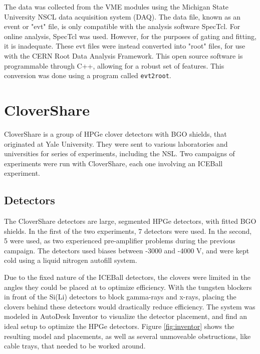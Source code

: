 The data was collected from the VME modules using the Michigan State University NSCL data acquisition system (DAQ)\citep{nscl:_daq}. The data file, known as an event or "evt" file, is only compatible with the analysis software SpecTcl\citep{nscl:_daq}. For online analysis, SpecTcl was used. However, for the purposes of gating and fitting, it is inadequate. These evt files were instead converted into "root" files, for use with the CERN Root Data Analysis Framework\citep{brun97:_root}. This open source software is programmable through C++, allowing for a robust set of features. This conversion was done using a program called \texttt{evt2root}\citep{smith14:_evt2root}.

\section{CloverShare}

CloverShare is a group of HPGe clover detectors with BGO shields, that originated at Yale University. They were sent to various laboratories and universities for series of experiments, including the NSL. Two campaigns of experiments were run with CloverShare, each one involving an ICEBall experiment.

\subsection{Detectors}

The CloverShare detectors are large, segmented HPGe detectors, with fitted BGO shields. In the first of the two experiments, 7 detectors were used. In the second, 5 were used, as two experienced pre-amplifier problems during the previous campaign. The detectors used biases between -3000 and -4000 V, and were kept cold using a liquid nitrogen autofill system.

Due to the fixed nature of the ICEBall detectors, the clovers were limited in the angles they could be placed at to optimize efficiency. With the tungsten blockers in front of the Si(Li) detectors to block gamma-rays and x-rays, placing the clovers behind these detectors would drastically reduce efficiency. The system was modeled in AutoDesk Inventor \citep{autodesk:_inventor} to visualize the detector placement, and find an ideal setup to optimize the HPGe detectors. Figure \ref{fig:inventor} shows the resulting model and placements, as well as several unmoveable obstructions, like cable trays, that needed to be worked around.




